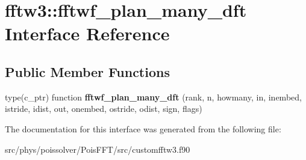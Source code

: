 \hypertarget{interfacefftw3_1_1fftwf__plan__many__dft}{}\section{fftw3\+:\+:fftwf\+\_\+plan\+\_\+many\+\_\+dft Interface Reference}
\label{interfacefftw3_1_1fftwf__plan__many__dft}
\subsection*{Public Member Functions}
\begin{DoxyCompactItemize}
\item 
type(c\+\_\+ptr) function {\bfseries fftwf\+\_\+plan\+\_\+many\+\_\+dft} (rank, n, howmany, in, inembed, istride, idist, out, onembed, ostride, odist, sign, flags)\hypertarget{interfacefftw3_1_1fftwf__plan__many__dft_a07c5a67270bb3f1ed322cdbd123686fb}{}\label{interfacefftw3_1_1fftwf__plan__many__dft_a07c5a67270bb3f1ed322cdbd123686fb}

\end{DoxyCompactItemize}


The documentation for this interface was generated from the following file\+:\begin{DoxyCompactItemize}
\item 
src/phys/poissolver/\+Pois\+F\+F\+T/src/customfftw3.\+f90\end{DoxyCompactItemize}

